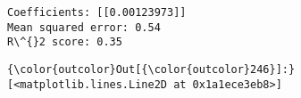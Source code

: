 \documentclass[11pt]{article}
\begin{document}
    \begin{Verbatim}[commandchars=\\\{\},fontsize=\footnotesize]
Coefficients: [[0.00123973]]
Mean squared error: 0.54
R\^{}2 score: 0.35

    \end{Verbatim}

\begin{Verbatim}[commandchars=\\\{\}]
{\color{outcolor}Out[{\color{outcolor}246}]:} [<matplotlib.lines.Line2D at 0x1a1ece3eb8>]
\end{Verbatim}
            
    \begin{center}
    \end{center}
    { \hspace*{\fill} \\}
    
\end{document}
